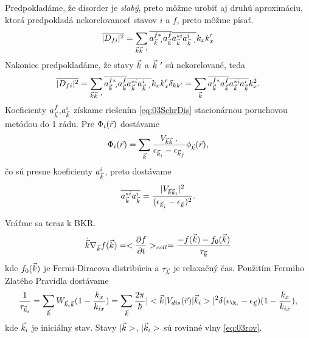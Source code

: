 Predpokladáme, že disorder je {\it slabý}, preto môžme urobiť aj druhú aproximáciu, ktorá predpokladá nekorelovanosť stavov $i$ a $f$, preto môžme písať.
\begin{align}
\overline{|D_{fi}|^2}=\sum_{\vk\vk\ '}\overline{a^{f*}_{\vk\ '}a^f_{\vk}}\overline{a^{*i}_{\vk}a^i_{\vk\ '}}k_xk_x' 
\end{align}
Nakoniec predpokladáme, že stavy $\vec{k}$ a $\vk\ '$ sú nekorelované, teda
\begin{align}
\overline{|D_{fi}|^2}=\sum_{\vk\vk\ '}\overline{a^{f*}_{\vk\ '}a^f_{\vk}}\overline{a^{*i}_{\vk}a^i_{\vk\ '}}k_xk_x'\delta_{kk'}=\sum_{\vk}\overline{a^{f*}_{\vk}a^f_{\vk}}\overline{a^{*i}_{\vk}a^i_{\vk}}k_x^2\text{.}
\end{align}
Koeficienty $a^f_{\vec{k}}$,$a^i_{\vec{k}}$ získame riešením \eqref{eq:03SchrDis} stacionárnou poruchovou metódou do 1 rádu. Pre $\Phi_i(\vec{r})$ dostávame
\begin{align}
\Phi_i(\vr)=\sum_{\vk}\frac{V_{\vk\vk\ '}}{\epsilon_{\vk_i}-\epsilon_{\vk_f}}\phi_{\vk}(\vr)\text{,}
\end{align}
čo sú presne koeficienty $a^i_{\vec{k}}$, preto dostávame
\begin{align}
\label{eq:03coef}
\overline{a^{*i}_{\vec{k}}a^i_{\vec{k}}}=\frac{|V_{\vec{k}\vec{k}_i}|^2}{(\epsilon_{\vec{k}_i}-\epsilon_{\vec{k}})^2}\text{.}
\end{align}

Vráťme sa teraz k BKR. 
\begin{align}
\dot{\vec{k}}\nabla_{\vec{k}}f(\vec{k})=<\frac{\partial f}{\partial t}>_{coll}=\frac{-f(\vec{k})-f_0(\vec{k})}{\tau_{\vec{k}}}
\end{align}
kde $f_0(\vec{k})$ je Fermi-Diracova distribúcia a $\tau_{\vec{k}}$ je relaxačný čas. Použitím Fermiho Zlatého Pravidla dostávame
\begin{align}
\label{eq:03goldenrule}
\frac{1}{\tau_{\vk_i}}=\sum_{\vk}W_{\vk_i\vk}(1-\frac{k_x}{k_{ix}}) = \sum_{\vk}\frac{2\pi}{\hbar}|\bra{\vk}V_{dis}(\vr)\ket{\vk_i}|^2\delta(\epsilon_{\k_i}-\epsilon_{\vk})(1-\frac{k_x}{k_{ix}}) \text{,}
\end{align}
kde $\vec{k}_i$ je iniciálny stav. Stavy $|\vec{k}>$, $|\vec{k}_i>$ sú rovinné vlny \eqref{eq:03rov}.

